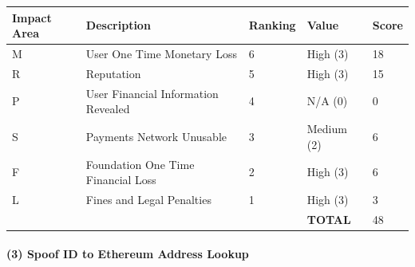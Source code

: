 \documentclass[12pt]{article} %
\begin{document}
{\begin{center}
\begin{tabular}{ | l | l | l | l | l |}
  \hline
  \textbf{Impact Area} & \textbf{Description} & \textbf{Ranking} & \textbf{Value} & \textbf{Score}
  \\ \hline
  M & User One Time Monetary Loss			& 6	& High (3)		& 18
  \\ \hline
  R & Reputation		& 5	& High (3)		& 15
  \\ \hline
  P & User Financial Information Revealed		& 4	& N/A (0)		& 0
  \\ \hline
  S & Payments Network Unusable					& 3	& Medium (2)	& 6
  \\ \hline
  F & Foundation One Time Financial Loss	& 2	& High (3)		& 6
  \\ \hline
  L & Fines and Legal Penalties						& 1	& High (3)		& 3
  \\ \hline
  & & & \textbf{TOTAL} & 48
  \\ \hline
\end{tabular}
\end{center}
\label{tab:severityProgrammingErrorInContract}

\paragraph{(3) Spoof ID to Ethereum Address Lookup }

}
\end{document}
